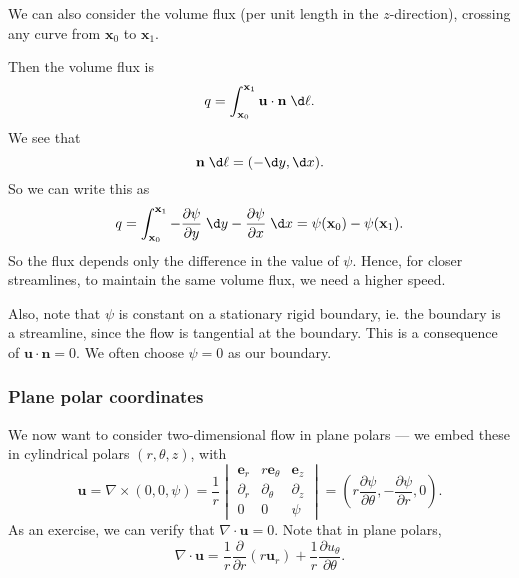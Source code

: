 \documentclass[a4paper]{article}
\begin{document}
We can also consider the volume flux (per unit length in the $z$-direction), crossing any curve from $\mathbf{x}_0$ to $\mathbf{x}_1$.
\begin{center}
\end{center}
Then the volume flux is
\[
  q = \int_{\mathbf{x}_0}^{\mathbf{x}_1} \mathbf{u}\cdot \mathbf{n}\;\d \ell.
\]
We see that
\[
  \mathbf{n}\;\d \ell = (-\d y, \d x).
\]
So we can write this as
\[
  q = \int_{\mathbf{x}_0}^{\mathbf{x}_1} -\frac{\partial \psi}{\partial y}\;\d y - \frac{\partial \psi}{\partial x}\;\d x = \psi(\mathbf{x}_0) - \psi(\mathbf{x}_1).
\]
So the flux depends only the difference in the value of $\psi$. Hence, for closer streamlines, to maintain the same volume flux, we need a higher speed.

Also, note that $\psi$ is constant on a stationary rigid boundary, ie. the boundary is a streamline, since the flow is tangential at the boundary. This is a consequence of $\mathbf{u}\cdot \mathbf{n} = 0$. We often choose $\psi = 0$ as our boundary.

\subsubsection{Plane polar coordinates}
We now want to consider two-dimensional flow in plane polars --- we embed these in cylindrical polars $(r, \theta, z)$, with
\[
  \mathbf{u} = \nabla \times (0, 0, \psi) = \frac{1}{r}
  \begin{vmatrix}
    \mathbf{e}_r & r \mathbf{e}_\theta & \mathbf{e}_z\\
    \partial_r & \partial_\theta & \partial_z\\
    0 & 0 & \psi
  \end{vmatrix}
  =\left(r \frac{\partial \psi}{\partial \theta}, -\frac{\partial \psi}{\partial r}, 0\right).
\]
As an exercise, we can verify that $\nabla \cdot \mathbf{u} = 0$. Note that in plane polars,
\[
  \nabla \cdot \mathbf{u} = \frac{1}{r} \frac{\partial}{\partial r} (r \mathbf{u}_r) + \frac{1}{r} \frac{\partial u_\theta}{\partial \theta}.
\]
\end{document}
